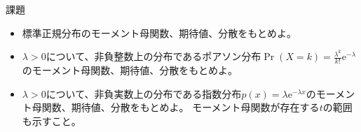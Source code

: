 \documentclass[lualatex,handout]{beamer}
\theoremstyle{definition}
\begin{document}
\begin{frame}{課題}
\begin{itemize}
\setlength{\itemsep}{2em}
\item 標準正規分布のモーメント母関数、期待値、分散をもとめよ。
\item $\lambda>0$について、非負整数上の分布であるポアソン分布$\Pr(X=k)=\frac{\lambda^k}{k!}\mathrm{e}^{-\lambda}$のモーメント母関数、期待値、分散をもとめよ。
\item $\lambda>0$について、非負実数上の分布である指数分布$p(x)=\lambda\mathrm{e}^{-\lambda x}$のモーメント母関数、期待値、分散をもとめよ。
モーメント母関数が存在する$t$の範囲も示すこと。
\end{itemize}
\end{frame}
\end{document}
